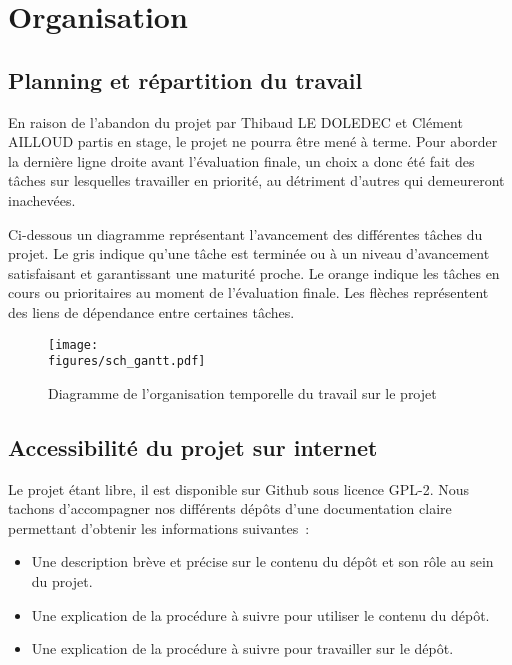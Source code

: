 \chapter{Organisation}

\section{Planning et répartition du travail}

En raison de l'abandon du projet par Thibaud LE DOLEDEC et Clément AILLOUD partis en stage, le projet ne pourra être mené à terme. Pour aborder la dernière ligne droite avant l'évaluation finale, un choix a donc été fait des tâches sur lesquelles travailler en priorité, au détriment d'autres qui demeureront inachevées.

\vspace{1cm}

Ci-dessous un diagramme représentant l’avancement des différentes tâches du projet. Le gris indique qu’une tâche est terminée ou à un niveau d’avancement satisfaisant et garantissant une maturité proche. Le orange indique les tâches en cours ou prioritaires au moment de l'évaluation finale. Les flèches représentent des liens de dépendance entre certaines tâches.

\begin{figure}[H]
    \centering
	\texttt{[image: \\figures/sch\_gantt.pdf]}
    \decoRule
    \caption[
    Diagramme de l'organisation temporelle du travail sur le projet]{
    Diagramme de l'organisation temporelle du travail sur le projet}
    \label{fig:Diagramme de l'organisation temporelle du travail sur le projet}
    \end{figure}


\section{Accessibilité du projet sur internet}

Le projet étant libre, il est disponible sur Github sous licence GPL-2. Nous tachons d'accompagner nos différents dépôts d'une documentation claire permettant d'obtenir les informations suivantes~:
\begin{itemize}[label=$\bullet$]
	\item Une description brève et précise sur le contenu du dépôt et son rôle au sein du projet.
	\item Une explication de la procédure à suivre pour utiliser le contenu du dépôt.
	\item Une explication de la procédure à suivre pour travailler sur le dépôt.
	\end{itemize}

